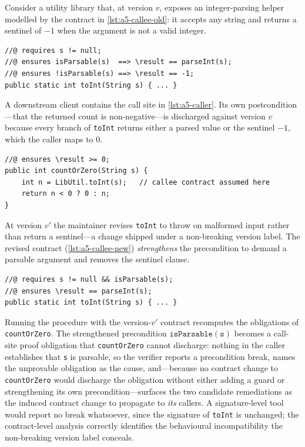 Consider a utility library that, at version $v$, exposes an integer-parsing helper modelled by the contract in \cref{lst:a5-callee-old}: it accepts any string and returns a sentinel of $-1$ when the argument is not a valid integer.

\begin{lstlisting}[style=code,caption={Library method \texttt{toInt} at version $v$ (callee contract).},label={lst:a5-callee-old}]
//@ requires s != null;
//@ ensures isParsable(s)  ==> \result == parseInt(s);
//@ ensures !isParsable(s) ==> \result == -1;
public static int toInt(String s) { ... }
\end{lstlisting}

A downstream client contains the call site in \cref{lst:a5-caller}. Its own postcondition---that the returned count is non-negative---is discharged against version $v$ because every branch of \texttt{toInt} returns either a parsed value or the sentinel $-1$, which the caller maps to $0$.

\begin{lstlisting}[style=code,caption={Client call site relying on the version-$v$ contract.},label={lst:a5-caller}]
//@ ensures \result >= 0;
public int countOrZero(String s) {
    int n = LibUtil.toInt(s);   // callee contract assumed here
    return n < 0 ? 0 : n;
}
\end{lstlisting}

At version $v'$ the maintainer revises \texttt{toInt} to throw on malformed input rather than return a sentinel---a change shipped under a non-breaking version label. The revised contract (\cref{lst:a5-callee-new}) \emph{strengthens} the precondition to demand a parsable argument and removes the sentinel clause.

\begin{lstlisting}[style=code,caption={Library method \texttt{toInt} at version $v'$ (strengthened precondition).},label={lst:a5-callee-new}]
//@ requires s != null && isParsable(s);
//@ ensures \result == parseInt(s);
public static int toInt(String s) { ... }
\end{lstlisting}

Running the procedure with the version-$v'$ contract recomputes the obligations of \texttt{countOrZero}. The strengthened precondition $\mathtt{isParsable(s)}$ becomes a call-site proof obligation that \texttt{countOrZero} cannot discharge: nothing in the caller establishes that \texttt{s} is parsable, so the verifier reports a precondition break, names the unprovable obligation as the cause, and---because no contract change to \texttt{countOrZero} would discharge the obligation without either adding a guard or strengthening its own precondition---surfaces the two candidate remediations as the induced contract change to propagate to \emph{its} callers. A signature-level tool would report no break whatsoever, since the signature of \texttt{toInt} is unchanged; the contract-level analysis correctly identifies the behavioural incompatibility the non-breaking version label conceals.

